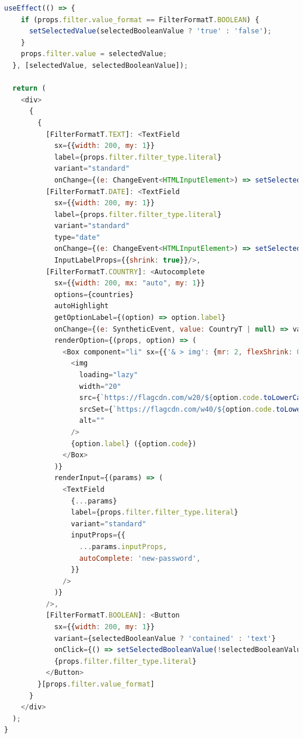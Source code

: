 \documentclass{article}
\begin{document}
\begin{lstlisting}[language=JavaScript, caption=src.components.filter.filter]
  useEffect(() => {
    if (props.filter.value_format == FilterFormatT.BOOLEAN) {
      setSelectedValue(selectedBooleanValue ? 'true' : 'false');
    }
    props.filter.value = selectedValue;
  }, [selectedValue, selectedBooleanValue]);

  return (
    <div>
      {
        {
          [FilterFormatT.TEXT]: <TextField
            sx={{width: 200, my: 1}}
            label={props.filter.filter_type.literal}
            variant="standard"
            onChange={(e: ChangeEvent<HTMLInputElement>) => setSelectedValue(e.target.value)}/>,
          [FilterFormatT.DATE]: <TextField
            sx={{width: 200, my: 1}}
            label={props.filter.filter_type.literal}
            variant="standard"
            type="date"
            onChange={(e: ChangeEvent<HTMLInputElement>) => setSelectedValue(e.target.value)}
            InputLabelProps={{shrink: true}}/>,
          [FilterFormatT.COUNTRY]: <Autocomplete
            sx={{width: 200, mx: "auto", my: 1}}
            options={countries}
            autoHighlight
            getOptionLabel={(option) => option.label}
            onChange={(e: SyntheticEvent, value: CountryT | null) => value != null ? setSelectedValue(value.code) : null}
            renderOption={(props, option) => (
              <Box component="li" sx={{'& > img': {mr: 2, flexShrink: 0}}} {...props}>
                <img
                  loading="lazy"
                  width="20"
                  src={`https://flagcdn.com/w20/${option.code.toLowerCase()}.png`}
                  srcSet={`https://flagcdn.com/w40/${option.code.toLowerCase()}.png 2x`}
                  alt=""
                />
                {option.label} ({option.code})
              </Box>
            )}
            renderInput={(params) => (
              <TextField
                {...params}
                label={props.filter.filter_type.literal}
                variant="standard"
                inputProps={{
                  ...params.inputProps,
                  autoComplete: 'new-password',
                }}
              />
            )}
          />,
          [FilterFormatT.BOOLEAN]: <Button
            sx={{width: 200, my: 1}}
            variant={selectedBooleanValue ? 'contained' : 'text'}
            onClick={() => setSelectedBooleanValue(!selectedBooleanValue)}>
            {props.filter.filter_type.literal}
          </Button>
        }[props.filter.value_format]
      }
    </div>
  );
}  
\end{lstlisting}
\end{document}
